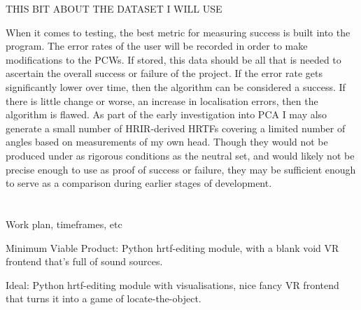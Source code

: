 \documentclass[10pt, oneside, a4paper, draft]{scrartcl}
\begin{document}
THIS BIT ABOUT THE DATASET I WILL USE

When it comes to testing, the best metric for measuring success is built into the program. The error rates of the user will be recorded in order to make modifications to the PCWs. If stored, this data should be all that is needed to ascertain the overall success or failure of the project. If the error rate gets significantly lower over time, then the algorithm can be considered a success. If there is little change or worse, an increase in localisation errors, then the algorithm is flawed. As part of the early investigation into PCA I may also generate a small number of HRIR-derived HRTFs covering a limited number of angles based on measurements of my own head. Though they would not be produced under as rigorous conditions as the neutral set, and would likely not be precise enough to use as proof of success or failure, they may be sufficient enough to serve as a comparison during earlier stages of development. 
\section*{}
Work plan, timeframes, etc

Minimum Viable Product: 
Python hrtf-editing module, with a blank void VR frontend that's full of sound sources. 

Ideal:
Python hrtf-editing module with visualisations, nice fancy VR frontend that turns it into a game of locate-the-object.
\end{document}
